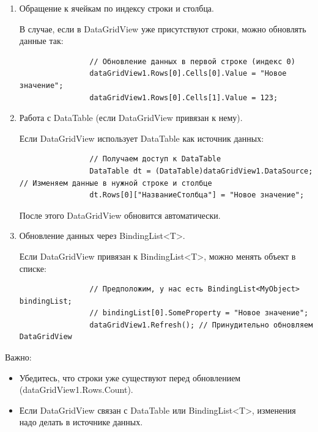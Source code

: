 \documentclass[12pt]{article}
\renewcommand{\texttt}[1]{{\small\ttfamily #1}}
\numberwithin{listing}{section}
\numberwithin{figure}{section}
\begin{document}
\begin{enumerate}
	\item Обращение к ячейкам по индексу строки и столбца.

	      В случае, если в \texttt{DataGridView} уже присутствуют строки, можно обновлять данные так:

	      \begin{verbatim}
                // Обновление данных в первой строке (индекс 0)
                dataGridView1.Rows[0].Cells[0].Value = "Новое значение";
                dataGridView1.Rows[0].Cells[1].Value = 123;
          \end{verbatim}

	\item Работа с \texttt{DataTable} (если \texttt{DataGridView} привязан к нему).

	      Если \texttt{DataGridView} использует \texttt{DataTable} как источник данных:

	      \begin{verbatim}
                // Получаем доступ к DataTable
                DataTable dt = (DataTable)dataGridView1.DataSource; // Изменяем данные в нужной строке и столбце
                dt.Rows[0]["НазваниеСтолбца"] = "Новое значение";
          \end{verbatim}

	      После этого \texttt{DataGridView} обновится автоматически.

	\item Обновление данных через \texttt{BindingList<T>}.

	      Если \texttt{DataGridView} привязан к \texttt{BindingList<T>}, можно менять объект в списке:

	      \begin{verbatim}
                // Предположим, у нас есть BindingList<MyObject> bindingList;
                // bindingList[0].SomeProperty = "Новое значение";
                dataGridView1.Refresh(); // Принудительно обновляем DataGridView
          \end{verbatim}
\end{enumerate}

\noindent \textcolor{CtpRed}{Важно:}
\begin{itemize}
	\item Убедитесь, что строки уже существуют перед обновлением (\texttt{dataGridView1.Rows.Count}).
	\item Если \texttt{DataGridView} связан с \texttt{DataTable} или \texttt{BindingList<T>}, изменения надо делать в источнике данных.
\end{itemize}
\end{document}
